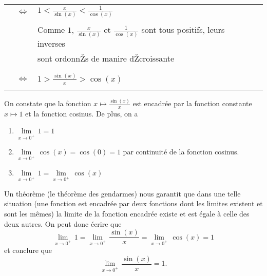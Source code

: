 \documentclass[10pt]{article}
\begin{document}
\begin{tabular}{llll}
     & $\Leftrightarrow$ & $1< \frac{x}{\sin(x)}<\frac{1}{\cos(x)}$                                                                                       \\
     &                   &                                                                                                                                \\
     &                   & Comme $1$, $\displaystyle\frac{x}{\sin(x)}$ et $\displaystyle\frac{1}{\cos(x)}$ sont tous positifs, leurs inverses             \\
     &                   & sont ordonnŽs de manire dŽcroissante                                                                                           \\
     &                   &                                                                                                                                \\
     & $\Leftrightarrow$ & $1> \frac{\sin(x)}{x}>\cos(x)$                                                                                                 \\
     &                   &                                                                                                                                \\
\end{tabular}

On constate que la fonction $x\mapsto \frac{\sin(x)}{x}$ est encadr\'ee par la fonction constante $x\mapsto 1$ et la fonction cosinus. De plus, on a
\begin{enumerate}
    \item $\displaystyle\underset{x\rightarrow 0^+}{\lim}\,1=1$
    \item $\displaystyle\underset{x\rightarrow 0^+}{\lim}\,\cos(x)=\cos(0)=1$ par continuit\'e de la fonction cosinus.
    \item $\displaystyle\underset{x\rightarrow 0^+}{\lim}\,1=\underset{x\rightarrow 0^+}{\lim}\,\cos(x)$
\end{enumerate}

Un th\'eor\`eme (le th\'eor\`eme des gendarmes) nous garantit que dans une telle situation (une fonction est encadr\'ee par deux fonctions dont les limites existent et sont les m\^emes) la limite de la fonction encadr\' ee existe et est \'egale \`a celle des deux autres.  On peut donc \'ecrire que $$\displaystyle\underset{x\rightarrow 0^+}{\lim}\,1=\underset{x\rightarrow 0^+}{\lim}\,\frac{\sin(x)}{x}=\underset{x\rightarrow 0^+}{\lim}\,\cos(x)=1$$
et conclure que $$\displaystyle\underset{x\rightarrow 0^+}{\lim}\,\frac{\sin(x)}{x}=1.$$
\end{document}
